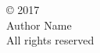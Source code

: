 
\thispagestyle{empty} %
\setcounter{page}{0} %
\null\vfill %
\begin{center}
  \SingleSpace %
\copyright \hspace{1mm} 2017\\
Author Name\\
All rights reserved\\
\end{center}
